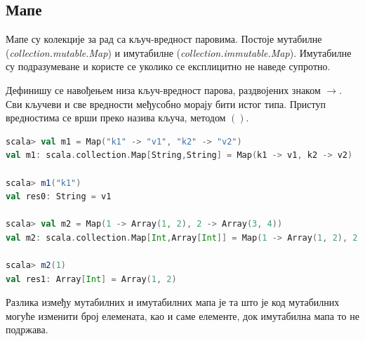 \documentclass[12pt,oneside]{memoir}
\begin{document}
\subsection{Мапе}
\label{subsec:scala_maps}

Мапе су колекције за рад са кључ-вредност паровима. Постоје мутабилне (\textit{collection.mutable.Map}) и имутабилне (\textit{collection.immutable.Map}). Имутабилне су подразумеване и користе се уколико се експлицитно не наведе супротно.

Дефинишу се навођењем низа кључ-вредност парова, раздвојених знаком $\rightarrow$. Сви кључеви и све вредности међусобно морају бити истог типа. Приступ вредностима се врши преко назива кључа, методом $()$.

\begin{lstlisting}[language=Scala, caption={Мапе у Скали}, label={lst:scala_app_maps_example}]
scala> val m1 = Map("k1" -> "v1", "k2" -> "v2")
val m1: scala.collection.Map[String,String] = Map(k1 -> v1, k2 -> v2)

scala> m1("k1")
val res0: String = v1

scala> val m2 = Map(1 -> Array(1, 2), 2 -> Array(3, 4))
val m2: scala.collection.Map[Int,Array[Int]] = Map(1 -> Array(1, 2), 2 -> Array(3, 4))

scala> m2(1)
val res1: Array[Int] = Array(1, 2)
\end{lstlisting}

Разлика између мутабилних и имутабилних мапа је та што је код мутабилних могуће изменити број елемената, као и саме елементе, док имутабилна мапа то не подржава.

\end{document}
